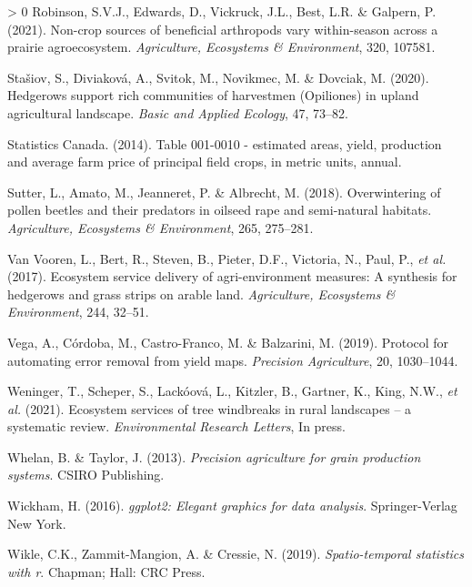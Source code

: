 \documentclass[]{elsarticle} %
\newlength{\cslhangindent}
\newenvironment{CSLReferences}[3] %
 {%
  \setlength{\parindent}{0pt}
  \ifodd #1 \everypar{\setlength{\hangindent}{\cslhangindent}}\ignorespaces\fi
  \ifnum #2 > 0
  \setlength{\parskip}{#2\baselineskip}
  \fi
 }%
 {}
\begin{document}
\begin{CSLReferences}{1}{0}
\leavevmode\hypertarget{ref-robinson2021}{}%
Robinson, S.V.J., Edwards, D., Vickruck, J.L., Best, L.R. \& Galpern, P. (2021). Non-crop sources of beneficial arthropods vary within-season across a prairie agroecosystem. \emph{Agriculture, Ecosystems {\&} Environment}, 320, 107581.

\leavevmode\hypertarget{ref-stasiov2020}{}%
Stašiov, S., Diviaková, A., Svitok, M., Novikmec, M. \& Dovciak, M. (2020). Hedgerows support rich communities of harvestmen ({Opiliones}) in upland agricultural landscape. \emph{Basic and Applied Ecology}, 47, 73--82.

\leavevmode\hypertarget{ref-statscan_canola2014}{}%
Statistics Canada. (2014). Table 001-0010 - estimated areas, yield, production and average farm price of principal field crops, in metric units, annual.

\leavevmode\hypertarget{ref-sutter2018b}{}%
Sutter, L., Amato, M., Jeanneret, P. \& Albrecht, M. (2018). Overwintering of pollen beetles and their predators in oilseed rape and semi-natural habitats. \emph{Agriculture, Ecosystems {\&} Environment}, 265, 275--281.

\leavevmode\hypertarget{ref-vanVooren2017}{}%
Van Vooren, L., Bert, R., Steven, B., Pieter, D.F., Victoria, N., Paul, P., \emph{et al.} (2017). Ecosystem service delivery of agri-environment measures: A synthesis for hedgerows and grass strips on arable land. \emph{Agriculture, Ecosystems {\&} Environment}, 244, 32--51.

\leavevmode\hypertarget{ref-vega2019}{}%
Vega, A., Córdoba, M., Castro-Franco, M. \& Balzarini, M. (2019). Protocol for automating error removal from yield maps. \emph{Precision Agriculture}, 20, 1030--1044.

\leavevmode\hypertarget{ref-weninger2021}{}%
Weninger, T., Scheper, S., Lackóová, L., Kitzler, B., Gartner, K., King, N.W., \emph{et al.} (2021). Ecosystem services of tree windbreaks in rural landscapes -- a systematic review. \emph{Environmental Research Letters}, In press.

\leavevmode\hypertarget{ref-whelan2013}{}%
Whelan, B. \& Taylor, J. (2013). \emph{Precision agriculture for grain production systems}. CSIRO Publishing.

\leavevmode\hypertarget{ref-wickham2016}{}%
Wickham, H. (2016). \emph{{ggplot2}: Elegant graphics for data analysis}. Springer-Verlag New York.

\leavevmode\hypertarget{ref-wickle2019}{}%
Wikle, C.K., Zammit-Mangion, A. \& Cressie, N. (2019). \emph{Spatio-temporal statistics with r}. Chapman; Hall: CRC Press.


\end{CSLReferences}
\end{document}
